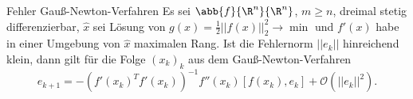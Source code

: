 \begin{karte}{Fehler Gauß-Newton-Verfahren}
    Es sei \( \abb{f}{\R^n}{\R^n} \), \(m\geq n\), dreimal stetig differenzierbar, 
    \( \widehat{x} \) sei Lösung von \( g(x) = \frac{1}{2}||f(x)||_2^2 \rightarrow \min \)
    und \(f'(x) \) habe in einer Umgebung von \( \widehat{x} \) maximalen Rang. Ist die 
    Fehlernorm \( ||e_k|| \) hinreichend klein, dann gilt für die Folge \( (x_k)_k \) 
    aus dem Gauß-Newton-Verfahren 
    \[ e_{k+1} = -(f'(x_k)^T f'(x_k))^{-1} f''(x_k) [f(x_k), e_k] + \mathcal{O}(||e_k||^2). \]
\end{karte}